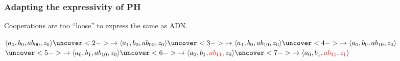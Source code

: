 
\begin{frame}
  \frametitle{Adapting the expressivity of PH}

Cooperations are too “loose” to express the same as ADN.

\medskip

$ \PHstate{a_0, b_0, ab_{00}, z_0}
  \uncover<2->{\rightarrow\PHstate{a_1, b_0, ab_{00}, z_0}}
  \uncover<3->{\rightarrow\PHstate{a_1, b_0, ab_{10}, z_0}}
  \uncover<4->{\rightarrow\PHstate{a_0, b_0, ab_{10}, z_0}}$
\\ \qquad
$ \uncover<5->{\rightarrow\PHstate{a_0, b_1, ab_{10}, z_0}}
  \uncover<6->{\rightarrow\PHstate{a_0, b_1, \redex{ab_{11}}, z_0}}
  \uncover<7->{\rightarrow\PHstate{a_0, b_1, \redex{ab_{11}}, \redex{z_1}}}$

\medskip


\begin{center}\end{center}

\end{frame}



